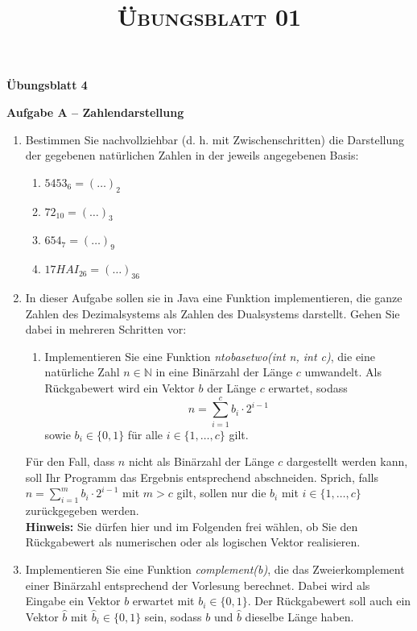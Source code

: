 \documentclass[paper=a4,fontsize=11pt]{scrartcl}%
\title{	
\normalfont \normalsize 
\textsc{Übungsblatt 01}
}
\numberwithin{equation}{section}
\begin{document}
\vspace*{-1cm}
\begin{center}
\Large{\textbf{Übungsblatt 4}}
\end{center}

\begin{center}\Large{\textbf{Aufgabe A -- Zahlendarstellung}}\end{center}
\begin{enumerate}
	\item Bestimmen Sie nachvollziehbar (d. h. mit Zwischenschritten) die Darstellung der gegebenen natürlichen Zahlen in der jeweils angegebenen Basis:
	\begin{enumerate}
		\item $5453_6 = (\dots)_2$
		\item $72_{10} = (\dots)_3$
		\item $654_7 = (\dots)_9$
		\item $17HAI_{26}=(\dots)_{36}$
	\end{enumerate}
	\item In dieser Aufgabe sollen sie in Java eine Funktion implementieren, die ganze Zahlen des Dezimalsystems als Zahlen des Dualsystems darstellt. Gehen Sie dabei in mehreren Schritten vor:
	\begin{enumerate}
		\item Implementieren  Sie  eine  Funktion \textit{ntobasetwo(int n, int c)},  die  eine  natürliche  Zahl $n\in \mathbb{N}$ in eine Binärzahl der Länge $c$ umwandelt. Als Rückgabewert wird ein Vektor $b$ der Länge $c$ erwartet, sodass
$$
    n = \sum_{i=1}^c b_i \cdot 2^{i-1}
$$
sowie $b_i \in \{0,1\}$ für alle $i\in\{1, \dots ,c\}$ gilt.
	\end{enumerate}
	Für den Fall, dass $n$ nicht als Binärzahl der Länge $c$ dargestellt werden kann, soll Ihr Programm das Ergebnis entsprechend abschneiden. Sprich, falls $n = \sum_{i=1}^m b_i \cdot 2^{i-1}$ mit $m > c$ gilt, sollen nur die $b_i$ mit $i\in \{1,\dots , c\}$ zurückgegeben werden.\\

\textbf{Hinweis:} Sie dürfen hier und im Folgenden frei wählen, ob Sie den Rückgabewert als numerischen oder als logischen Vektor realisieren.
	\item Implementieren Sie eine Funktion \textit{complement(b)}, die das Zweierkomplement einer Binärzahl entsprechend der Vorlesung berechnet. Dabei wird als Eingabe ein Vektor $b$ erwartet mit $b_i \in \{0,1\}$. Der Rückgabewert soll auch ein Vektor $\hat b$ mit $\hat b_i \in \{0,1\}$ sein, sodass $b$ und $\hat b$ dieselbe Länge haben.
\end{enumerate}
\end{document}
